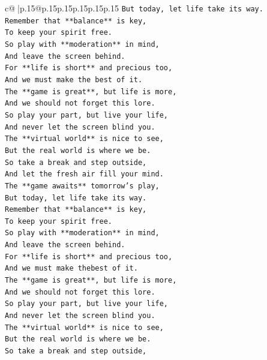 \documentclass{article}
\begin{document}
{\begin{supertabular}{c@{$\;$}|p{.15\linewidth}@{}p{.15\linewidth}p{.15\linewidth}p{.15\linewidth}p{.15\linewidth}p{.15\linewidth}}
{{{\texttt{But today, let life take its way.} \\
\texttt{Remember that **balance** is key,} \\
\texttt{To keep your spirit free.} \\
\texttt{So play with **moderation** in mind,} \\
\texttt{And leave the screen behind.} \\
\texttt{For **life is short** and precious too,} \\
\texttt{And we must make the best of it.} \\
\texttt{The **game is great**, but life is more,} \\
\texttt{And we should not forget this lore.} \\
\texttt{So play your part, but live your life,} \\
\texttt{And never let the screen blind you.} \\
\texttt{The **virtual world** is nice to see,} \\
\texttt{But the real world is where we be.} \\
\texttt{So take a break and step outside,} \\
\texttt{And let the fresh air fill your mind.} \\
\texttt{The **game awaits** tomorrow's play,} \\
\texttt{But today, let life take its way.} \\
\texttt{Remember that **balance** is key,} \\
\texttt{To keep your spirit free.} \\
\texttt{So play with **moderation** in mind,} \\
\texttt{And leave the screen behind.} \\
\texttt{For **life is short** and precious too,} \\
\texttt{And we must make thebest of it.} \\
\texttt{The **game is great**, but life is more,} \\
\texttt{And we should not forget this lore.} \\
\texttt{So play your part, but live your life,} \\
\texttt{And never let the screen blind you.} \\
\texttt{The **virtual world** is nice to see,} \\
\texttt{But the real world is where we be.} \\
\texttt{So take a break and step outside,} \\
}}}
\end{supertabular}}
\end{document}
